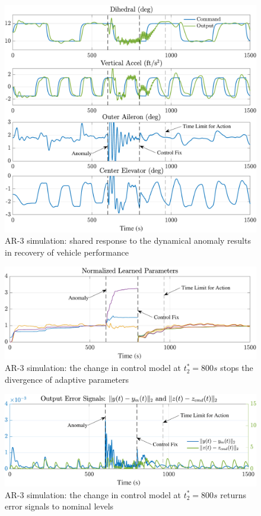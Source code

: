 \documentclass[english]{ifacconf}
\begin{document}
\begin{figure}[htbp]
	\centering
	\includegraphics[width=\columnwidth]{../fig/ar3.pdf}
	\caption{AR-3 simulation: shared response to the dynamical anomaly results in recovery of vehicle performance}
	\label{fig:ar3-sim}
\end{figure}

\begin{figure}[htbp]
	\centering
	\includegraphics[width=\columnwidth]{../fig/ar3-params.pdf}
	\caption{AR-3 simulation: the change in control model at $t_2^* = 800 s$ stops the divergence of adaptive parameters}
	\label{fig:ar3-params}
\end{figure}

\begin{figure}[htbp]
	\centering
	\includegraphics[width=\columnwidth]{../fig/ar3-err.pdf}
	\caption{AR-3 simulation: the change in control model at $t_2^* = 800 s$ returns error signals to nominal levels}
	\label{fig:ar3-err}
\end{figure}
\end{document}
